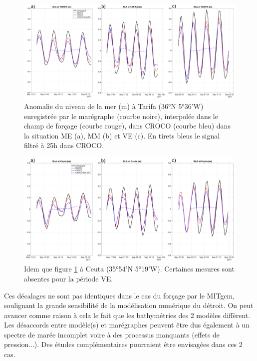 \documentclass[a4paper,11pt]{report}
\begin{document}
\begin{figure}[!h]
 	\includegraphics[width=\textwidth]{./sla_tarifa_all.png}
 	\caption{Anomalie du niveau de la mer (m) à Tarifa (36°N 5°36'W) enregistrée par le marégraphe 	(courbe noire), 
 	interpolée dans le champ de forçage (courbe rouge), dans CROCO (courbe bleu) dans la situation ME (a), MM (b) et VE (c). 
 	En tirets bleus le signal filtré à 25h dans CROCO.}
 	\label{fig_maree_tar}
\end{figure}

\begin{figure}[!h]
	\includegraphics[width=\textwidth]{./sla_ceuta_all.png}
 	\caption{Idem que figure \ref{fig_maree_tar} à Ceuta (35°54'N 5°19'W). 
 	Certaines mesures sont absentes pour la période VE.}
 	\label{fig_maree_ceu}
\end{figure}

Ces décalages ne sont pas identiques dans le cas du forçage par le MITgcm, 
soulignant la grande sensibilité de la modélisation numérique du détroit. On peut avancer comme raison à cela le fait que les bathymétries des 
2 modèles diffèrent. Les désaccords entre modèle(s) et marégraphes peuvent être dus également à un spectre de marée
incomplet voire à des processus manquants (effets de pression...). Des études complémentaires pourraient être envisagées
dans ces 2 cas. \\
\end{document}
